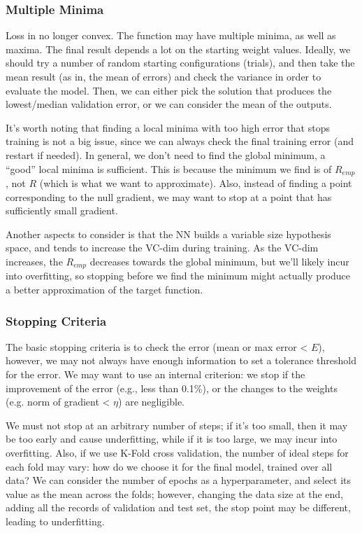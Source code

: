 \subsubsection{Multiple Minima}

Loss in no longer convex. The function may have multiple minima, as well as maxima. The final result depends a lot on the starting weight values. Ideally, we should try a number of random starting configurations (trials), and then take the mean result (as in, the mean of errors) and check the variance in order to evaluate the model. Then, we can either pick the solution that produces the lowest/median validation error, or we can consider the mean of the outputs.

It's worth noting that finding a local minima with too high error that stops training is not a big issue, since we can always check the final training error (and restart if needed). In general, we don't need to find the global minimum, a ``good'' local minima is sufficient. This is because the minimum we find is of $R_{emp}$, not $R$ (which is what we want to approximate). Also, instead of finding a point corresponding to the null gradient, we may want to stop at a point that has sufficiently small gradient.

Another aspects to consider is that the NN builds a variable size hypothesis space, and tends to increase the VC-dim during training. As the VC-dim increases, the $R_{emp}$ decreases towards the global minimum, but we'll likely incur into overfitting, so stopping before we find the minimum might actually produce a better approximation of the target function.

\subsubsection{Stopping Criteria}

The basic stopping criteria is to check the error (mean or max error < $E$), however, we may not always have enough information to set a tolerance threshold for the error. We may want to use an internal criterion: we stop if the improvement of the error (e.g., less than 0.1\%), or the changes to the weights (e.g. norm of gradient < $\eta$) are negligible.

We must not stop at an arbitrary number of steps; if it's too small, then it may be too early and cause underfitting, while if it is too large, we may incur into overfitting. Also, if we use K-Fold cross validation, the number of ideal steps for each fold may vary: how do we choose it for the final model, trained over all data? We can consider the number of epochs as a hyperparameter, and select its value as the mean across the folds; however, changing the data size at the end, adding all the records of validation and test set, the stop point may be different, leading to underfitting.

